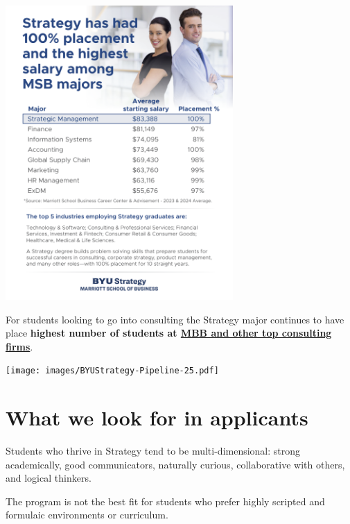 \documentclass[
  letterpaper,
  DIV=11,
  numbers=noendperiod]{scrreprt}
\begin{document}
\begin{center}
\includegraphics[width=0.65\textwidth,height=\textheight]{images/BYUStrategy-Placement-25.png}
\end{center}

For students looking to go into consulting the Strategy major continues
to have place \textbf{highest number of students at
\href{https://byu-my.sharepoint.com/:b:/g/personal/murff_byu_edu/EXAQsKD1LS5Pm8VckCiUU4gBE9NLnEU2Oieu1exM-GKkUA?e=BxObQe}{MBB
and other top consulting firms}}.

\begin{center}
\texttt{[image: images/BYUStrategy-Pipeline-25.pdf]}
\end{center}

\section*{What we look for in
applicants}\label{what-we-look-for-in-applicants}


Students who thrive in Strategy tend to be multi-dimensional: strong
academically, good communicators, naturally curious, collaborative with
others, and logical thinkers.

The program is not the best fit for students who prefer highly scripted
and formulaic environments or curriculum.
\end{document}
